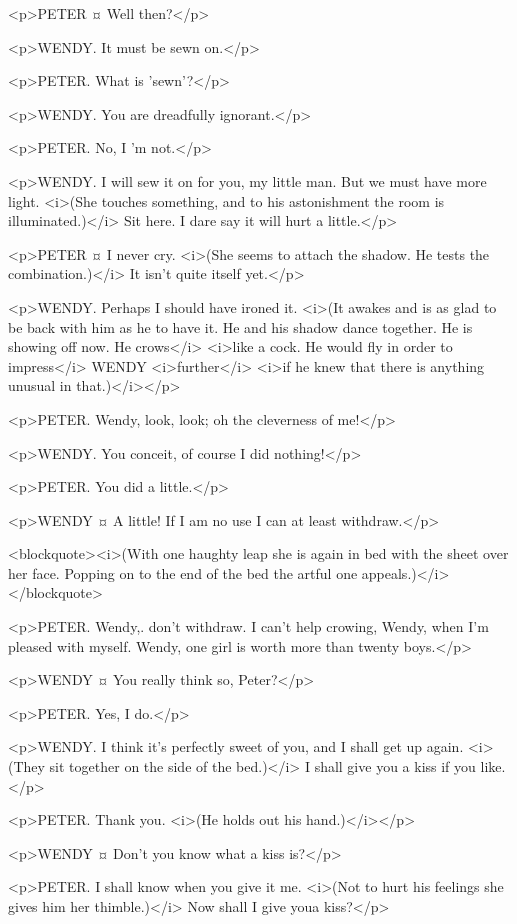 <p>PETER ¤
Well then?</p>

<p>WENDY. It must be sewn on.</p>

<p>PETER. What is 'sewn'?</p>

<p>WENDY. You are dreadfully ignorant.</p>

<p>PETER. No, I 'm not.</p>

<p>WENDY. I will sew it on for you, my little man. But we must have more light. <i>(She touches something, and to his astonishment the room is illuminated.)</i> Sit here. I dare say it will hurt a little.</p>

<p>PETER ¤
I never cry. <i>(She seems to attach the shadow. He tests the combination.)</i> It isn't quite itself yet.</p>

<p>WENDY. Perhaps I should have ironed it. <i>(It awakes and is as glad to be back with him as he to have it. He and his shadow dance together. He is showing off now. He crows</i> <i>like a cock. He would fly in order to impress</i> WENDY <i>further</i> <i>if he knew that there is anything unusual in that.)</i></p>

<p>PETER. Wendy, look, look; oh the cleverness of me!</p>

<p>WENDY. You conceit, of course I did nothing!</p>

<p>PETER. You did a little.</p>

<p>WENDY ¤
A little! If I am no use I can at least withdraw.</p>

<blockquote><i>(With one haughty leap she is again in bed with the sheet over her face. Popping on to the end of the bed the artful one appeals.)</i></blockquote>

<p>PETER. Wendy,. don't withdraw. I can't help crowing, Wendy, when I'm pleased with myself. Wendy, one girl is worth more than twenty boys.</p>

<p>WENDY ¤
You really think so, Peter?</p>

<p>PETER. Yes, I do.</p>

<p>WENDY. I think it's perfectly sweet of you, and I shall get up again. <i>(They sit together on the side of the bed.)</i> I shall give you a kiss if you like.</p>

<p>PETER. Thank you. <i>(He holds out his hand.)</i></p>

<p>WENDY ¤
Don't you know what a kiss is?</p>

<p>PETER. I shall know when you give it me. <i>(Not to hurt his feelings she gives him her thimble.)</i> Now shall I give youa kiss?</p>

